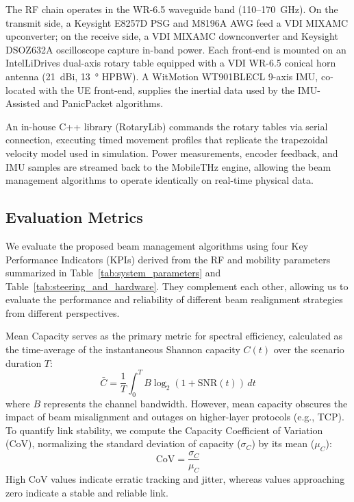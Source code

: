 \documentclass[fleqn,10pt]{wlscirep}
\begin{document}
The RF chain operates in the WR-6.5 waveguide band (110--170~GHz). On the transmit side, a Keysight E8257D PSG and M8196A AWG feed a VDI MIXAMC upconverter; on the receive side, a VDI MIXAMC downconverter and Keysight DSOZ632A oscilloscope capture in-band power. Each front-end is mounted on an IntelLiDrives dual-axis rotary table equipped with a VDI WR-6.5 conical horn antenna (\SI{21}{dBi}, \SI{13}{\degree} HPBW). A WitMotion WT901BLECL 9-axis IMU, co-located with the UE front-end, supplies the inertial data used by the IMU-Assisted and PanicPacket algorithms.

An in-house C++ library (RotaryLib) commands the rotary tables via serial connection, executing timed movement profiles that replicate the trapezoidal velocity model used in simulation. Power measurements, encoder feedback, and IMU samples are streamed back to the MobileTHz engine, allowing the beam management algorithms to operate identically on real-time physical data.


\subsection*{Evaluation Metrics}

We evaluate the proposed beam management algorithms using four Key Performance Indicators (KPIs) derived from the RF and mobility parameters summarized in Table~\ref{tab:system_parameters} and Table~\ref{tab:steering_and_hardware}. They complement each other, allowing us to evaluate the performance and reliability of different beam realignment strategies from different perspectives.

Mean Capacity serves as the primary metric for spectral efficiency, calculated as the time-average of the instantaneous Shannon capacity $C(t)$ over the scenario duration $T$:
\begin{equation}
    \bar{C} = \frac{1}{T} \int_{0}^{T} B \log_2(1 + \text{SNR}(t)) \, dt
\end{equation}
where $B$ represents the channel bandwidth. However, mean capacity obscures the impact of beam misalignment and outages on higher-layer protocols (e.g., TCP). To quantify link stability, we compute the Capacity Coefficient of Variation (CoV), normalizing the standard deviation of capacity ($\sigma_C$) by its mean ($\mu_C$):
\begin{equation}
    \text{CoV} = \frac{\sigma_C}{\mu_C}
\end{equation}
High CoV values indicate erratic tracking and jitter, whereas values approaching zero indicate a stable and reliable link.
\end{document}
